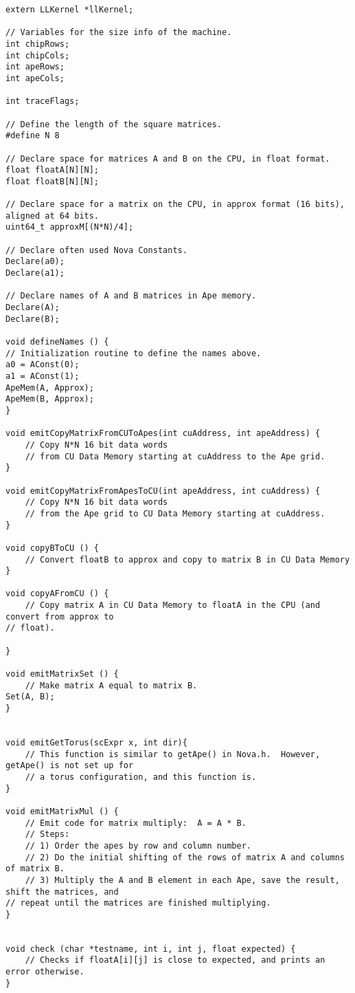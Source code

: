 \documentclass[10pt]{article}
\begin{document}
\begin{verbatim}
extern LLKernel *llKernel;

// Variables for the size info of the machine.
int chipRows;
int chipCols;
int apeRows;
int apeCols;

int traceFlags;

// Define the length of the square matrices.
#define N 8

// Declare space for matrices A and B on the CPU, in float format.
float floatA[N][N];
float floatB[N][N];

// Declare space for a matrix on the CPU, in approx format (16 bits), aligned at 64 bits.
uint64_t approxM[(N*N)/4];

// Declare often used Nova Constants.
Declare(a0);
Declare(a1);

// Declare names of A and B matrices in Ape memory.
Declare(A);
Declare(B);

void defineNames () {
// Initialization routine to define the names above.
a0 = AConst(0);
a1 = AConst(1);
ApeMem(A, Approx);
ApeMem(B, Approx);
}

void emitCopyMatrixFromCUToApes(int cuAddress, int apeAddress) {
    // Copy N*N 16 bit data words
    // from CU Data Memory starting at cuAddress to the Ape grid.
}

void emitCopyMatrixFromApesToCU(int apeAddress, int cuAddress) {
    // Copy N*N 16 bit data words
    // from the Ape grid to CU Data Memory starting at cuAddress.
}

void copyBToCU () {
    // Convert floatB to approx and copy to matrix B in CU Data Memory
}

void copyAFromCU () {
    // Copy matrix A in CU Data Memory to floatA in the CPU (and convert from approx to
// float).

}

void emitMatrixSet () {
    // Make matrix A equal to matrix B.
Set(A, B);
}


void emitGetTorus(scExpr x, int dir){
    // This function is similar to getApe() in Nova.h.  However, getApe() is not set up for
    // a torus configuration, and this function is.
}

void emitMatrixMul () {
    // Emit code for matrix multiply:  A = A * B.
    // Steps:
    // 1) Order the apes by row and column number.
    // 2) Do the initial shifting of the rows of matrix A and columns of matrix B.
    // 3) Multiply the A and B element in each Ape, save the result, shift the matrices, and
// repeat until the matrices are finished multiplying.
}


void check (char *testname, int i, int j, float expected) {
    // Checks if floatA[i][j] is close to expected, and prints an error otherwise.
}



\end{verbatim}
\end{document}
